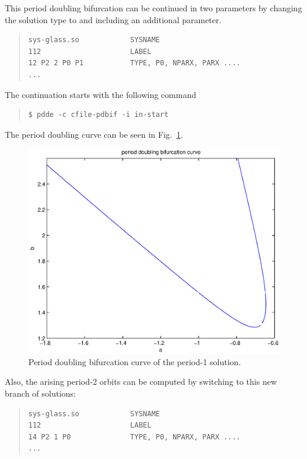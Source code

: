 \documentclass[10pt,a4paper]{ddedoc}
\begin{document}
This period doubling bifurcation can be continued in two parameters 
by changing the solution type to  and including an additional parameter.
{ \small \begin{quote} \begin{lstlisting}[basicstyle=\tt,frame=single]
sys-glass.so            SYSNAME
112                     LABEL
12 P2 2 P0 P1           TYPE, P0, NPARX, PARX ....
...
\end{lstlisting} \end{quote} } \noindent
The continuation starts with the following command
{ \small \begin{quote} \begin{lstlisting}[basicstyle=\tt,frame=single]
$ pdde -c cfile-pdbif -i in-start
\end{lstlisting} \end{quote} } \noindent
The period doubling curve can be seen in Fig.\ \ref{pdbif}.
\begin{figure}
\begin{center}
\includegraphics[scale=0.6]{fig/pdbif2.eps}
\end{center}
\caption{Period doubling bifurcation curve of the period-1 solution.}
\label{pdbif}
\end{figure}
Also, the arising period-2 orbits can be computed by switching to this new branch of solutions:
{ \small \begin{quote} \begin{lstlisting}[basicstyle=\tt,frame=single]
sys-glass.so            SYSNAME
112                     LABEL
14 P2 1 P0              TYPE, P0, NPARX, PARX ....
...
\end{lstlisting} \end{quote} } \noindent
\end{document}
